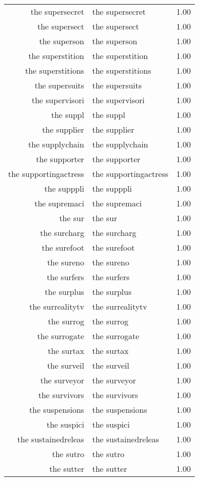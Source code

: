 \begin{table}[ht]
\begin{tabular}{rlr}
  the supersecret & the supersecret & 1.00 \\ 
  the supersect & the supersect & 1.00 \\ 
  the superson & the superson & 1.00 \\ 
  the superstition & the superstition & 1.00 \\ 
  the superstitions & the superstitions & 1.00 \\ 
  the supersuits & the supersuits & 1.00 \\ 
  the supervisori & the supervisori & 1.00 \\ 
  the suppl & the suppl & 1.00 \\ 
  the supplier & the supplier & 1.00 \\ 
  the supplychain & the supplychain & 1.00 \\ 
  the supporter & the supporter & 1.00 \\ 
  the supportingactress & the supportingactress & 1.00 \\ 
  the supppli & the supppli & 1.00 \\ 
  the supremaci & the supremaci & 1.00 \\ 
  the sur & the sur & 1.00 \\ 
  the surcharg & the surcharg & 1.00 \\ 
  the surefoot & the surefoot & 1.00 \\ 
  the sureno & the sureno & 1.00 \\ 
  the surfers & the surfers & 1.00 \\ 
  the surplus & the surplus & 1.00 \\ 
  the surrealitytv & the surrealitytv & 1.00 \\ 
  the surrog & the surrog & 1.00 \\ 
  the surrogate & the surrogate & 1.00 \\ 
  the surtax & the surtax & 1.00 \\ 
  the surveil & the surveil & 1.00 \\ 
  the surveyor & the surveyor & 1.00 \\ 
  the survivors & the survivors & 1.00 \\ 
  the suspensions & the suspensions & 1.00 \\ 
  the suspici & the suspici & 1.00 \\ 
  the sustainedreleas & the sustainedreleas & 1.00 \\ 
  the sutro & the sutro & 1.00 \\ 
  the sutter & the sutter & 1.00 \\ 

\end{tabular}
\end{table}
